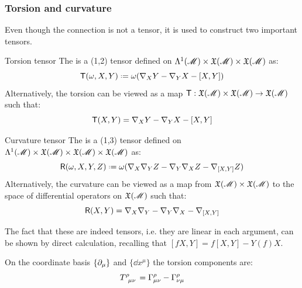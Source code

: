 \subsubsection{Torsion and curvature}

Even though the connection is not a tensor, it is used to construct two important tensors.

\begin{definition}{Torsion tensor}{}
  The  is a (1,2) tensor defined on $ \Lambda^{1}(\mathscr{M}) \times \mathfrak{X}(\mathscr{M}) \times \mathfrak{X}(\mathscr{M}) $ as:
  \begin{equation}
    \tors(\omega,X,Y) \defeq \omega (\na_X Y - \na_Y X - [X,Y])
  \end{equation}
  Alternatively, the torsion can be viewed as a map $ \textsf{T} : \mathfrak{X}(\mathscr{M}) \times \mathfrak{X}(\mathscr{M}) \rightarrow \mathfrak{X}(\mathscr{M}) $ such that:
  \begin{equation}
    \textsf{T}(X,Y) = \nabla_X Y - \nabla_Y X - [X,Y]
  \end{equation}
\end{definition}

\begin{definition}{Curvature tensor}{}
  The  is a (1,3) tensor defined on $ \Lambda^{1}(\mathscr{M}) \times \mathfrak{X}(\mathscr{M}) \times \mathfrak{X}(\mathscr{M}) \times \mathfrak{X}(\mathscr{M}) $ as:
  \begin{equation}
    \riem(\omega,X,Y,Z) \defeq \omega (\na_X \na_Y Z - \na_Y \na_X Z - \na_{[X,Y]} Z)
  \end{equation}
  Alternatively, the curvature can be viewed as a map from $ \mathfrak{X}(\mathscr{M}) \times \mathfrak{X}(\mathscr{M}) $ to the space of differential operators on $ \mathfrak{X}(\mathscr{M}) $ such that:
  \begin{equation}
    \textsf{R}(X,Y) = \nabla_X \nabla_Y - \nabla_Y \nabla_X - \nabla_{[X,Y]}
  \end{equation}
\end{definition}

The fact that these are indeed tensors, i.e. they are linear in each argument, can be shown by direct calculation, recalling that $ [fX,Y] = f[X,Y] - Y(f) X $.

\begin{proposition}{}{}
  On the coordinate basis $ \{\partial_\mu\} $ and $ \{\dd x^\mu\} $ the torsion components are:
  \begin{equation}
    \tensor{T}{^\rho _\mu _\nu} = \Gamma^\rho_{\mu \nu} - \Gamma^\rho_{\nu \mu}
  \end{equation}
\end{proposition}

